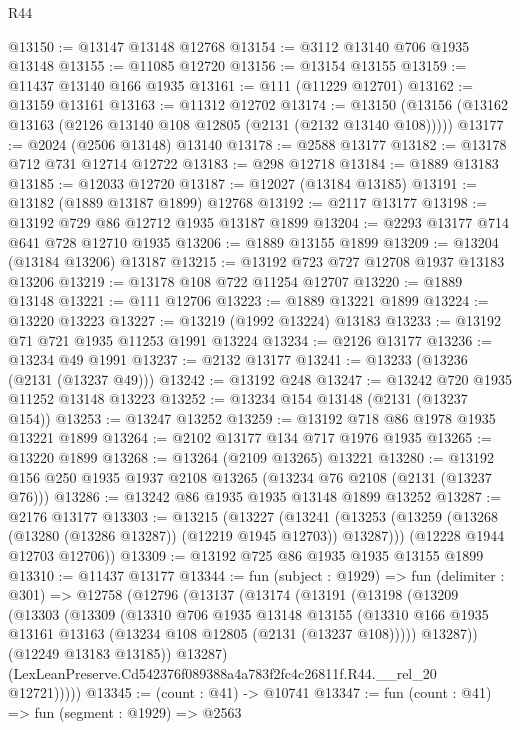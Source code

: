 \begin{lexlean}{R44}
\begin{coremodule}
@13150 := @13147 @13148 @12768
@13154 := @3112 @13140 @706 @1935 @13148
@13155 := @11085 @12720
@13156 := @13154 @13155
@13159 := @11437 @13140 @166 @1935
@13161 := @111 (@11229 @12701)
@13162 := @13159 @13161
@13163 := @11312 @12702
@13174 := @13150 (@13156 (@13162 @13163 (@2126 @13140 @108 @12805 (@2131 (@2132 @13140 @108)))))
@13177 := @2024 (@2506 @13148) @13140
@13178 := @2588 @13177
@13182 := @13178 @712 @731 @12714 @12722
@13183 := @298 @12718
@13184 := @1889 @13183
@13185 := @12033 @12720
@13187 := @12027 (@13184 @13185)
@13191 := @13182 (@1889 @13187 @1899) @12768
@13192 := @2117 @13177
@13198 := @13192 @729 @86 @12712 @1935 @13187 @1899
@13204 := @2293 @13177 @714 @641 @728 @12710 @1935
@13206 := @1889 @13155 @1899
@13209 := @13204 (@13184 @13206) @13187
@13215 := @13192 @723 @727 @12708 @1937 @13183 @13206
@13219 := @13178 @108 @722 @11254 @12707
@13220 := @1889 @13148
@13221 := @111 @12706
@13223 := @1889 @13221 @1899
@13224 := @13220 @13223
@13227 := @13219 (@1992 @13224) @13183
@13233 := @13192 @71 @721 @1935 @11253 @1991 @13224
@13234 := @2126 @13177
@13236 := @13234 @49 @1991
@13237 := @2132 @13177
@13241 := @13233 (@13236 (@2131 (@13237 @49)))
@13242 := @13192 @248
@13247 := @13242 @720 @1935 @11252 @13148 @13223
@13252 := @13234 @154 @13148 (@2131 (@13237 @154))
@13253 := @13247 @13252
@13259 := @13192 @718 @86 @1978 @1935 @13221 @1899
@13264 := @2102 @13177 @134 @717 @1976 @1935
@13265 := @13220 @1899
@13268 := @13264 (@2109 @13265) @13221
@13280 := @13192 @156 @250 @1935 @1937 @2108 @13265 (@13234 @76 @2108 (@2131 (@13237 @76)))
@13286 := @13242 @86 @1935 @1935 @13148 @1899 @13252
@13287 := @2176 @13177
@13303 := @13215
    (@13227
      (@13241 (@13253 (@13259 (@13268 (@13280 (@13286 @13287)) (@12219 @1945 @12703)) @13287)))
      (@12228 @1944 @12703 @12706))
@13309 := @13192 @725 @86 @1935 @1935 @13155 @1899
@13310 := @11437 @13177
@13344 := fun (subject : @1929) =>
  fun (delimiter : @301) =>
  @12758
    (@12796
      (@13137
        (@13174
          (@13191
            (@13198
              (@13209
                (@13303
                  (@13309
                    (@13310
                      @706
                      @1935
                      @13148
                      @13155
                      (@13310 @166 @1935 @13161 @13163 (@13234 @108 @12805 (@2131 (@13237 @108)))))
                    @13287))
                (@12249 @13183 @13185))
              @13287)
            (LexLeanPreserve.Cd542376f089388a4a783f2fc4c26811f.R44.__rel_20 @12721)))))
@13345 := (count : @41) -> @10741
@13347 := fun (count : @41) => fun (segment : @1929) => @2563

\end{coremodule}
\end{lexlean}
